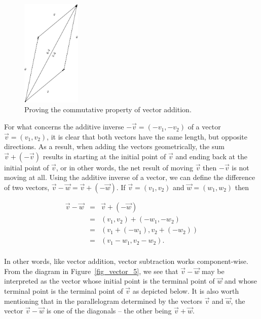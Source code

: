 \begin{figure}
	\begin{center}
			\includegraphics[width=0.25\textwidth]{fig_vector_4}
	\caption{Proving the commutative property of vector addition. }
	\label{fig_vector_4}
	\end{center}
\end{figure}

For what concerns the additive inverse $-\vec{v} = \left(-v_1, -v_2\right)$  of a vector $\vec{v} = \left(v_1, v_2\right)$, it is clear that both vectors have the same length, but opposite directions.  As a result, when adding the vectors geometrically, the sum $\vec{v} + (-\vec{v})$ results in starting at the initial point of $\vec{v}$ and ending back at the initial point of $\vec{v}$, or in other words, the net result of moving $\vec{v}$ then $-\vec{v}$ is not moving at all.  Using the additive inverse of a vector, we can define the difference of two vectors, $\vec{v} - \vec{w} = \vec{v} + (-\vec{w})$.   If $\vec{v} = \left(v_1,v_2\right)$ and $\vec{w} = \left(w_1,w_2\right)$ then  

\[\begin{array}{rcl} \vec{v} - \vec{w} & = & \vec{v} + (-\vec{w}) \\
&  = & \left(v_1,v_2\right) + \left(-w_1,-w_2\right) \\
& = &  \left(v_1 + \left(-w_1\right),v_2 + \left(-w_2\right) \right)\\
& = &  \left(v_1 -w_1,v_2 - w_2\right). \\ \end{array} \]

In other words, like vector addition, vector subtraction works component-wise.   From the diagram in Figure~\ref{fig_vector_5}, we see that  $\vec{v}-\vec{w}$ may be interpreted as the vector whose initial point is the terminal point of $\vec{w}$ and whose terminal point is the terminal point of $\vec{v}$ as depicted below.  It is also worth mentioning that in the parallelogram determined by the vectors $\vec{v}$ and $\vec{w}$, the vector $\vec{v}-\vec{w}$ is one of the diagonals -- the other being $\vec{v} + \vec{w}$.

